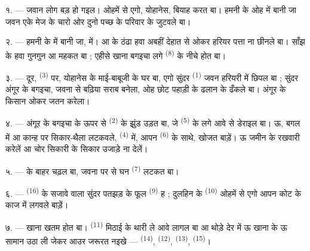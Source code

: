 \VUsaut{4.0mm}
\VUsaut{1.6mm}
\VUsaut{3.2mm}

\VUsaut{1.6mm}
\VUsaut{2.6mm}

\VUsaut{3.0mm}

१. --- जवान लोग बड़ हो गइल। ओहमें से एगो, योहानेस, बियाह करत बा। हमनी
के ओह  में बानी जा जवन एके मेज के चारो ओर दुनो
पच्छ के परिवार के जुटवले बा।

२. --- हमनी के  में बानी जा,  में।
 आ  के ठंढा हवा अबहीं देहात से ओकर हरियर
पत्ता ना छीनले बा। साँझ के हवा गुनगुन आ महकत बा ; एहीसे खाना बगइचा
लगे  \textsuperscript{(8)} के नीचे होत बा।

३. --- दूर,  \textsuperscript{(3)} पर, योहानेस के माई-बाबूजी
के घर बा, एगो सुंदर  \textsuperscript{(1)} जवन हरियरी में
छिपल बा ; सुंदर अंगूर के बगइचा, जवना से बढ़िया सराब बनेला, ओह छोट
पहाड़ी के ढलान के ढँकले बा। अंगूर के किसान ओकर जतन करेला।

४. --- अंगूर के बगइचा के ऊपर से  \textsuperscript{(2)} के
झुंड उड़त बा, जे  \textsuperscript{(5)} के लगे आवे
से डेराइल बा। ऊ, बगल में  आ कान्ह पर सिकार-थैला लटकवले,
 \textsuperscript{(4)} में, आपन 
\textsuperscript{(6)} के साथे, खोजत बाड़ें। ऊ जमीन के रखवारी करेलें आ चोर
सिकारी के सिकार उजाड़े ना देलें।

५. ---  के बाहर  चढ़ल बा, जवना पर
से घन  \textsuperscript{(7)} लटकत बा।

६. ---  \textsuperscript{(16)} के सजावे वाला सुंदर पतझड़ के
फूल  \textsuperscript{(9)} ह ; दुलहिन के 
\textsuperscript{(10)} ओहमें से एगो आपन कोट के काज में लगवले बाड़ें।

७. --- खाना खतम होत बा।  \textsuperscript{(11)} मिठाई के
थारी ले आवे लागल बा आ थोड़े देर में ऊ खाना के ऊ सामान उठा ली जेकर आउर
जरूरत नइखे —  \textsuperscript{(14)}, 
\textsuperscript{(12)},  \textsuperscript{(13)},
 \textsuperscript{(15)}।

